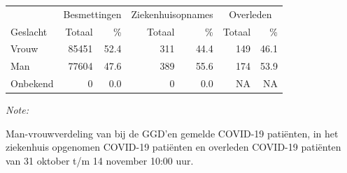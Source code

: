 \documentclass[
  english,
  man,floatsintext]{apa6}
\begin{document}
\begin{table}
\centering\begingroup\fontsize{11}{13}\selectfont

\begin{threeparttable}
\begin{tabular}{lrrrrrr}
\toprule
\multicolumn{1}{c}{ } & \multicolumn{2}{c}{Besmettingen} & \multicolumn{2}{c}{Ziekenhuisopnames} & \multicolumn{2}{c}{Overleden} \\
\cmidrule(l{3pt}r{3pt}){2-3} \cmidrule(l{3pt}r{3pt}){4-5} \cmidrule(l{3pt}r{3pt}){6-7}
Geslacht & Totaal & \% & Totaal & \% & Totaal & \%\\
\midrule
Vrouw & 85451 & 52.4 & 311 & 44.4 & 149 & 46.1\\
Man & 77604 & 47.6 & 389 & 55.6 & 174 & 53.9\\
Onbekend & 0 & 0.0 & 0 & 0.0 & NA & NA\\
\bottomrule
\end{tabular}
\begin{tablenotes}
\item \textit{Note: } 
\item Man-vrouwverdeling van bij de GGD’en gemelde COVID-19 patiënten, in het ziekenhuis opgenomen COVID-19 patiënten en overleden COVID-19 patiënten van 31 oktober t/m 14 november 10:00 uur.
\end{tablenotes}
\end{threeparttable}
\endgroup{}
\end{table}
\newpage
\end{document}

